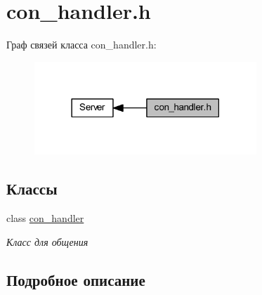 \hypertarget{group__con__handler__h}{}\section{con\+\_\+handler.\+h}
\label{group__con__handler__h}
Граф связей класса con\+\_\+handler.\+h\+:\nopagebreak
\begin{figure}[H]
\begin{center}
\leavevmode
\includegraphics[width=237pt]{group__con__handler__h}
\end{center}
\end{figure}
\subsection*{Классы}
\begin{DoxyCompactItemize}
\item 
class \mbox{\hyperlink{classcon__handler}{con\+\_\+handler}}
\begin{DoxyCompactList}\small\item\em Класс для общения \end{DoxyCompactList}\end{DoxyCompactItemize}


\subsection{Подробное описание}
